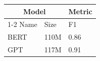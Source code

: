 \begin{table}[htbp]
\centering
\begin{tabular}{lll}
\toprule
\multicolumn{2}{c}{Model} & Metric \\
\cmidrule(lr){1-2}
Name & Size & F1 \\
\midrule
BERT & 110M & 0.86 \\
GPT & 117M & 0.91 \\
\bottomrule
\end{tabular}
\end{table}
